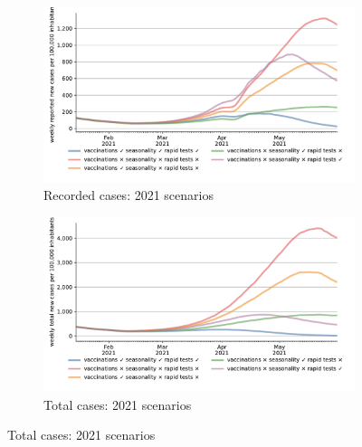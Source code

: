 \begin{figure}[!tp]
    \centering

    \begin{subfigure}[b]{0.475\textwidth}
        \centering
        \includegraphics[width=\textwidth]{figures/results/figures/scenario_comparisons/effect_of_channels_on_pessimistic_scenario/full_new_known_case}
        \caption{{Recorded cases: 2021 scenarios}}
        \label{fig:2021_scenarios_recorded}
    \end{subfigure}
    \hfill
    \begin{subfigure}[b]{0.475\textwidth}
        \centering
        \includegraphics[width=\textwidth]{figures/results/figures/scenario_comparisons/effect_of_channels_on_pessimistic_scenario/full_newly_infected}
        \caption{{Total cases: 2021 scenarios}}
        \label{fig:2021_scenarios_newly_infected}
    \end{subfigure}


\end{figure}
